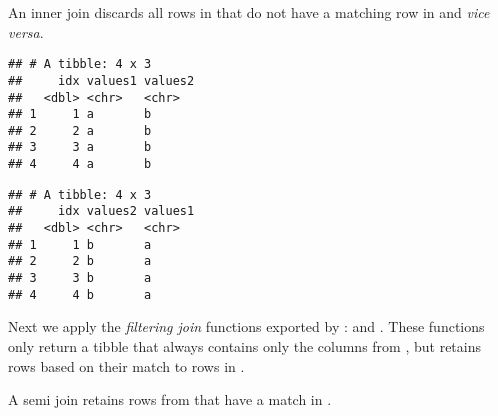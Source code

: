\documentclass[krantz2]{krantz}\usepackage{knitr}
\begin{document}
An inner join discards all rows in  that do not have a matching row in  and \emph{vice versa}.

\begin{knitrout}\footnotesize
{}\color{fgcolor}\begin{kframe}
\begin{alltt}
\hlstd{(}   
\end{alltt}


{\ttfamily\noindent\itshape\color{messagecolor}{\#\# Joining with `by = join\_by(idx)`}}\begin{verbatim}
## # A tibble: 4 x 3
##     idx values1 values2
##   <dbl> <chr>   <chr>  
## 1     1 a       b      
## 2     2 a       b      
## 3     3 a       b      
## 4     4 a       b
\end{verbatim}
\end{kframe}
\end{knitrout}

\begin{knitrout}\footnotesize
{}\color{fgcolor}\begin{kframe}
\begin{alltt}
\hlstd{(}   
\end{alltt}


{\ttfamily\noindent\itshape\color{messagecolor}{\#\# Joining with `by = join\_by(idx)`}}\begin{verbatim}
## # A tibble: 4 x 3
##     idx values2 values1
##   <dbl> <chr>   <chr>  
## 1     1 b       a      
## 2     2 b       a      
## 3     3 b       a      
## 4     4 b       a
\end{verbatim}
\end{kframe}
\end{knitrout}

Next we apply the \emph{filtering join} functions exported by :  and . These functions only return a tibble that always contains only the columns from , but retains rows based on their match to rows in .

A semi join retains rows from  that have a match in .
\end{document}
